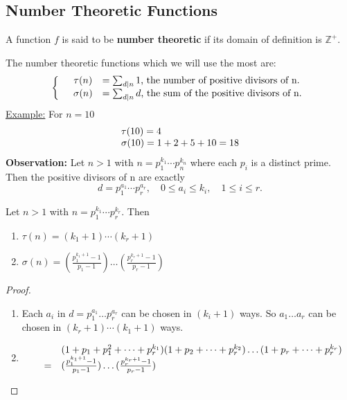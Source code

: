 \documentclass{report}
\begin{document}
\subsection*{Number Theoretic Functions}
\begin{defi}
	A function $f$ is said to be \textbf{number theoretic} if its domain of definition is $\mathbb{Z}^+$.
\end{defi}
The number theoretic functions which we will use the most are:
\[
\left \{
\begin{array}{l c l}
&\tau(n)& = \sum_{d \mid n}1 \text{,   the number of positive divisors of n.}\\
&\sigma(n)&= \sum_{d \mid n}d \text{,   the sum of the positive divisors of n.}\\
\end{array}
\right.
\]
\underline{Example:} For $n=10$
\[
\begin{array}{l c l}
\tau(10)=4\\
\sigma(10)=1+2+5+10=18\\
\end{array}
\]
\textbf{Observation:} Let $n>1$ with  $n=p_1^{k_1} \cdots p_n^{k_n}$ where each $p_i$ is a distinct prime.\\
Then the positive divisors of n are exactly
\[d=p_1^{a_1} \cdots p_r^{a_r},\quad 0 \leq a_i \leq k_i, \quad 1\leq i\leq r. \]
\begin{thm} Let $n>1$ with $n=p_1^{k_1} \cdots p_r^{k_r}$. Then \\
	\begin{enumerate}
		\item $\tau(n)=(k_1+1) \cdots (k_r+1)$
		\item $\sigma(n)=(\frac{p_1^{k_1+1}-1}{p_1-1})\dots(\frac{p_r^{k_r+1}-1}{p_r-1})$
	\end{enumerate}
\end{thm}
\begin{proof}
	\begin{enumerate}
		\item Each $a_i$ in $d=p_1^{a_1} \dots p_r^{a_r}$ can be chosen in $(k_i+1)$ ways. So $a_1 \dots a_r$ can be chosen in $(k_r+1) \cdots (k_1+1)$ ways.
		\item \[
						\begin{array}{l c l}
						&&(1+p_1+p_1^2+\dots+p_r^{k_1})(1+p_2+\dots+p_r^{k_2})\dots(1+p_r+\dots+p_r^{k_r})\\
						&=& (\frac{p_1^{k_1+1}-1}{p_1-1})\dots(\frac{p_r^{k_r+1}-1}{p_r-1})\\
						\end{array}
					\]
	\end{enumerate}
\end{proof}
\end{document}
